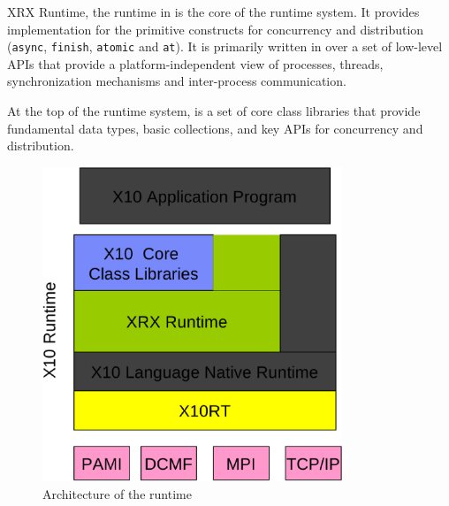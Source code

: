 XRX Runtime, the \xten runtime in \xten is the core of the \xten runtime system.
It provides implementation for the primitive \xten constructs for concurrency
and distribution (\texttt{async}, \texttt{finish}, \texttt{atomic} and
\texttt{at}). It is primarily written in \xten over a set of low-level APIs that
provide a platform-independent view of processes, threads, synchronization
mechanisms and inter-process communication. 

At the top of the \xten runtime system, is a set of core
class libraries that provide fundamental data types, basic collections, and key
APIs for concurrency and distribution.   

\begin{figure}[p]
    \centering
    \includegraphics[width=0.8\textwidth]{Figures/x10runtime.eps}
    \caption{Architecture of the \xten runtime}
    \label{fig:x10runtime}
\end{figure}

